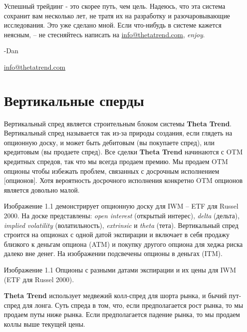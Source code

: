 \documentclass[12pt,DIV=18]{scrartcl}
\begin{document}
\bigskip

Успешный трейдинг - это скорее путь, чем цель. Надеюсь, что эта система сохранит вам несколько лет, не тратя их на разработку и разочаровывающие исследования. Это уже сделано мной. Если что-нибудь в системе кажется неясным, -- не стесняйтесь написать на \textcolor{Blue}{\href{mailto:info@thetatrend.com}{info@thetatrend.com}}, \textit{enjoy}.

\bigskip

-Dan\par
\textcolor{Blue}{\href{mailto:info@thetatrend.com}{info@thetatrend.com}}

\bigskip

\section{Вертикальные сперды}
\label{chapter1}

\bigskip

Вертикальный спред является строительным блоком системы \textbf{Theta Trend}. Вертикальный спред называется так из-за природы создания, если глядеть на опционную доску, и может быть дебитовым (вы покупаете спред), или кредитовым (вы продаете спред). Все сделки \textbf{Theta Trend} начинаются с OTM кредитных спредов, так что мы всегда продаем премию. Мы продаем OTM опционы чтобы избежать проблем, связанных с досрочным исполнением [опционов]. Хотя вероятность досрочного исполнения конкретно OTM опционов является довольно малой.

\bigskip

Изображение 1.1 демонстрирует опционную доску для IWM -- ETF для Russel 2000. На доске представлены: \textit{open interest} (открытый интерес), \textit{delta} (дельта), \textit{implied  volatility} (волатильность), \textit{extrinsic} и \textit{theta} (тета). Вертикальный спред строится на опционах с одной датой экспирации и включает в себя продажу близкого к деньгам опциона (ATM) и покупку другого опциона для хеджа риска далеко вне денег. На изображении подсвечены опционы в деньгах (ITM).

\bigskip

Изображение 1.1 Опционы с разными датами экспирации и их цены для IWM (ETF для Russel 2000).

\bigskip

\textbf{Theta Trend} использует медвежий колл-спред для шорта рынка, и бычий пут-спред для лонга. Суть спреда в том, что, если предполагается рост рынка, то мы продаем путы ниже рынка. Если предполагается падение рынка, то мы продаем коллы выше текущей цены.
\end{document}
